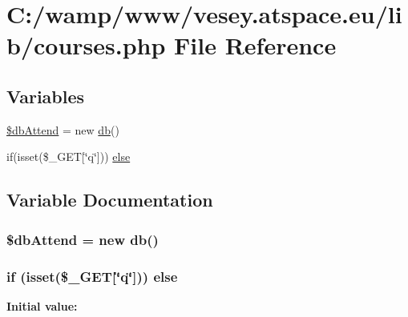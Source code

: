 \hypertarget{courses_8php}{\section{C\-:/wamp/www/vesey.atspace.\-eu/lib/courses.php File Reference}
\label{courses_8php}
}
\subsection*{Variables}
\begin{DoxyCompactItemize}
\item 
\hyperlink{courses_8php_a51faed1b981ba82fd1ba157f3c3b7779}{\$db\-Attend} = new \hyperlink{classdb}{db}()
\item 
if(isset(\$\-\_\-\-G\-E\-T\mbox{[}\char`\"{}q\char`\"{}\mbox{]})) \hyperlink{courses_8php_aa6c102c49f7c0c4eb9a85bcd08fc9875}{else}
\end{DoxyCompactItemize}


\subsection{Variable Documentation}
\hypertarget{courses_8php_a51faed1b981ba82fd1ba157f3c3b7779}{
\subsubsection[{\$db\-Attend}]{\setlength{\rightskip}{0pt plus 5cm}\$db\-Attend = new {\bf db}()}}\label{courses_8php_a51faed1b981ba82fd1ba157f3c3b7779}
\hypertarget{courses_8php_aa6c102c49f7c0c4eb9a85bcd08fc9875}{
\subsubsection[{else}]{\setlength{\rightskip}{0pt plus 5cm}if (isset(\$\-\_\-\-G\-E\-T\mbox{[}\char`\"{}q\char`\"{}\mbox{]})) else}}\label{courses_8php_aa6c102c49f7c0c4eb9a85bcd08fc9875}
{\bfseries Initial value\-:}
